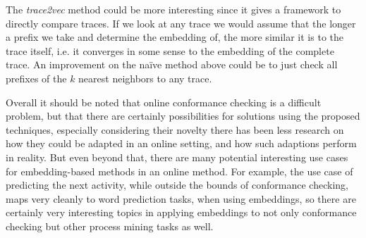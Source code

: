 \documentclass[runningheads]{template/llncs}
\begin{document}
The \emph{trace2vec} method could be more interesting since it gives a framework to directly compare traces.
If we look at any trace we would assume that the longer a prefix we take and determine the embedding of, the more similar it is to the trace itself, i.e. it converges in some sense to the embedding of the complete trace.
An improvement on the naïve method above could be to just check all prefixes of the $k$ nearest neighbors to any trace.

Overall it should be noted that online conformance checking is a difficult problem, but that there are certainly possibilities for solutions using the proposed techniques, especially considering their novelty there has been less research on how they could be adapted in an online setting, and how such adaptions perform in reality.
But even beyond that, there are many potential interesting use cases for embedding-based methods in an online method.
For example, the use case of predicting the next activity, while outside the bounds of conformance checking, maps very cleanly to word prediction tasks, when using embeddings, so there are certainly very interesting topics in applying embeddings to not only conformance checking  but other process mining tasks as well.

%
%
%


%
\end{document}

